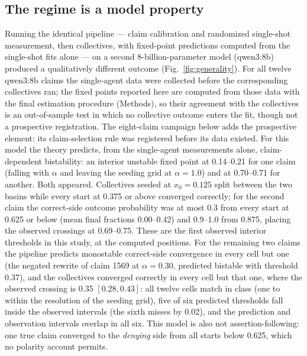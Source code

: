 \documentclass[11pt]{article}
\begin{document}
\subsection{The regime is a model property}\label{sec:generality}

Running the identical pipeline --- claim calibration and randomized
single-shot measurement, then collectives, with fixed-point predictions
computed from the single-shot fits alone --- on a second 8-billion-parameter
model (qwen3:8b) produced a
qualitatively different outcome (Fig.~\ref{fig:generality}). For all twelve
qwen3:8b claims the single-agent data were collected before the
corresponding collectives ran; the fixed points reported here are computed
from those data with the final estimation procedure (Methods), so their
agreement with the collectives is an out-of-sample test in which no
collective outcome enters the fit, though not a prospective registration.
The eight-claim campaign below adds the prospective element: its
claim-selection rule was registered before its data existed. For
this model the theory predicts, from the single-agent measurements alone,
claim-dependent bistability: an interior unstable fixed point at 0.14--0.21
for one claim (falling with $\alpha$ and leaving the seeding grid at
$\alpha = 1.0$) and at 0.70--0.71 for another. Both appeared. Collectives
seeded at $x_0 = 0.125$ split between the two basins while every start at
0.375 or above converged correctly; for the second claim the correct-side
outcome probability was at most 0.3 from every start at 0.625 or below (mean
final fractions 0.00--0.42) and 0.9--1.0 from 0.875, placing the observed
crossings at 0.69--0.75. These are the first observed
interior thresholds in this study, at the computed positions. For the
remaining two claims the pipeline predicts monostable correct-side
convergence in every cell but one (the negated rewrite of claim 1569 at
$\alpha = 0.30$, predicted bistable with threshold 0.37), and the collectives
converged correctly in every cell but that one, where the observed crossing
is 0.35 $[0.28, 0.43]$: all twelve cells match in class (one to within the
resolution of the seeding grid), five of six predicted thresholds fall inside
the observed intervals (the sixth misses by 0.02), and the prediction and
observation intervals overlap in all six. This model is also not
assertion-following: one true claim converged to the \emph{denying} side from
all starts below 0.625, which no polarity account permits.
\end{document}
